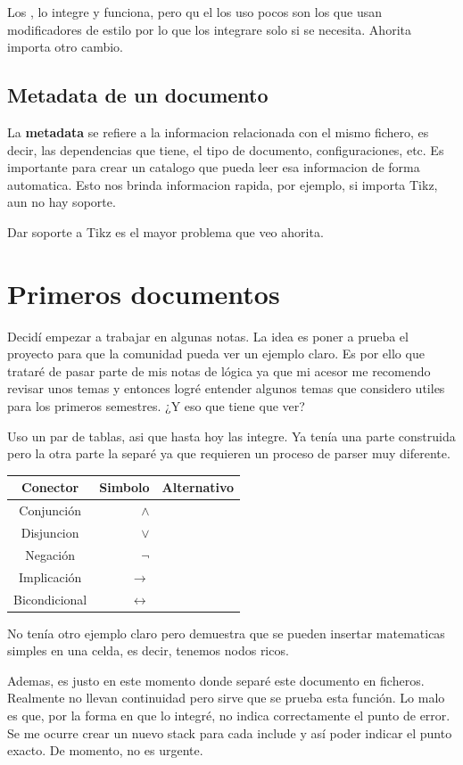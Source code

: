 \documentclass{article}
\begin{document}
  Los , lo
  integre y funciona, pero qu el los uso pocos son los que usan modificadores
  de estilo por lo que los integrare solo si se necesita. Ahorita importa otro cambio.
  
  \section{ Metadata de un documento }
  
  La {\bfseries metadata} se refiere a la informacion relacionada con el mismo fichero,
  es decir, las dependencias que tiene, el tipo de documento, configuraciones, etc. Es
  importante para crear un catalogo que pueda leer esa informacion de forma automatica.
  Esto nos brinda informacion rapida, por ejemplo, si importa Tikz, aun no hay soporte.
  
  \alert{ Dar soporte a Tikz es el mayor problema que veo ahorita. }
  
  \chapter{ Primeros documentos }
  
  Decidí empezar a trabajar en algunas notas. La idea es poner a prueba el proyecto para
  que la comunidad pueda ver un ejemplo claro. Es por ello que trataré de pasar parte de
  mis notas de lógica ya que mi acesor me recomendo revisar unos temas y entonces logré
  entender algunos temas que considero utiles para los primeros semestres. ¿Y eso que
  tiene que ver?
  
  Uso un par de tablas, asi que hasta hoy las integre. Ya tenía una parte construida pero
  la otra parte la separé ya que requieren un proceso de parser muy diferente.
  
  \begin{tabular}{ c|rr }
    Conector & Simbolo & Alternativo \\
    \hline
    Conjunción    & $ \land $ & \\
    Disjuncion    & $ \lor $ & \\
    Negación      & $ \neg $ & ~ \\
    Implicación   & $ \rightarrow $ & \\
    Bicondicional & $ \leftrightarrow $ & \\
    \hline
  \end{tabular}
  
  No tenía otro ejemplo claro pero demuestra que se pueden insertar matematicas simples
  en una celda, es decir, tenemos nodos ricos.
  
  Ademas, es justo en este momento donde separé este documento en ficheros. Realmente no
  llevan continuidad pero sirve que se prueba esta función. Lo malo es que, por la forma
  en que lo integré, no indica correctamente el punto de error. Se me ocurre crear un
  nuevo stack para cada include y así poder indicar el punto exacto. De momento, no es urgente.
\end{document}
